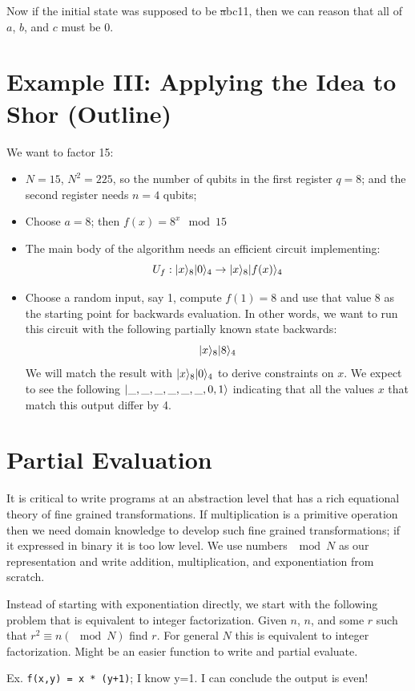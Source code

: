 \documentclass{article}
\begin{document}
Now if the initial state was supposed to be \st{a}{b}{c}{1}{1}, then we
can reason that all of $a$, $b$, and $c$ must be 0.

\section{Example III: Applying the Idea to Shor (Outline)}

We want to factor 15:
\begin{itemize}
\item $N = 15$, $N^2 = 225$, so the number of qubits in the first
  register $q=8$; and the second register needs $n=4$ qubits;
\item Choose $a=8$; then $f(x) = 8^x \mod{15}$
\item The main body of the algorithm needs an efficient circuit implementing:
  \[
  U_f : | x \rangle_8| 0 \rangle_4 \rightarrow | x \rangle_8| f(x) \rangle_4
  \]
\item Choose a random input, say 1, compute $f(1) = 8$ and use that
  value 8 as the starting point for backwards evaluation. In other
  words, we want to run this circuit with the following partially
  known state backwards:
  \[
  | x \rangle_8| 8 \rangle_4
  \]
  We will match the result with $| x \rangle_8| 0 \rangle_4$ to derive
  constraints on $x$. We expect to see the following
  $| \_,\_,\_,\_,\_,\_,0,1 \rangle$ indicating that all the values $x$ that match
  this output differ by 4.
\end{itemize}


\section{Partial Evaluation}

It is critical to write programs at an abstraction level that has a
rich equational theory of fine grained transformations. If
multiplication is a primitive operation then we need domain knowledge
to develop such fine grained transformations; if it expressed in
binary it is too low level. We use numbers $\mod{N}$ as our
representation and write addition, multiplication, and exponentiation
from scratch.


Instead of starting with exponentiation directly, we start with the
following problem that is equivalent to integer factorization. Given
$n$, $n$, and some $r$ such that $r^2 \equiv n (\mod{N})$ find
$r$. For general $N$ this is equivalent to integer
factorization. Might be an easier function to write and partial
evaluate.

Ex. \verb|f(x,y) = x * (y+1)|; I know y=1. I can conclude the output is even!


\end{document}
